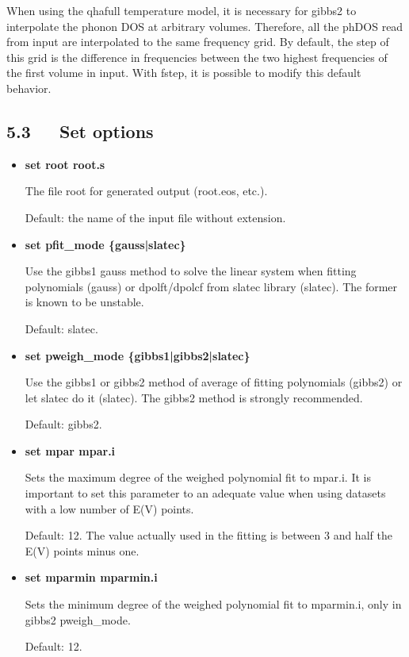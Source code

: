 \documentclass[a4paper]{article}
\begin{document}
When using the qhafull temperature model, it is necessary for gibbs2
to interpolate the phonon DOS at arbitrary volumes. Therefore, all the
phDOS read from input are interpolated to the same frequency grid. By
default, the step of this grid is the difference in frequencies
between the two highest frequencies of the first volume in input. With
fstep, it is possible to modify this default behavior.


\subsection{5.3~~~Set options%
  \label{set-options}%
}
%
\begin{itemize}

\item \textbf{set root root.s}

The file root for generated output (root.eos, etc.).

Default: the name of the input file without extension.

\item \textbf{set pfit\_mode \{gauss|slatec\}}

Use the gibbs1 gauss method to solve the linear system when fitting
polynomials (gauss) or dpolft/dpolcf from slatec library
(slatec). The former is known to be unstable.

Default: slatec.

\item \textbf{set pweigh\_mode \{gibbs1|gibbs2|slatec\}}

Use the gibbs1 or gibbs2 method of average of fitting polynomials
(gibbs2) or let slatec do it (slatec). The gibbs2 method is strongly
recommended.

Default: gibbs2.

\item \textbf{set mpar mpar.i}

Sets the maximum degree of the weighed polynomial fit to mpar.i. It
is important to set this parameter to an adequate value when using
datasets with a low number of E(V) points.

Default: 12. The value actually used in the fitting is between 3 and
half the E(V) points minus one.

\item \textbf{set mparmin mparmin.i}

Sets the minimum degree of the weighed polynomial fit to mparmin.i,
only in gibbs2 pweigh\_mode.

Default: 12.


\end{itemize}
\end{document}
